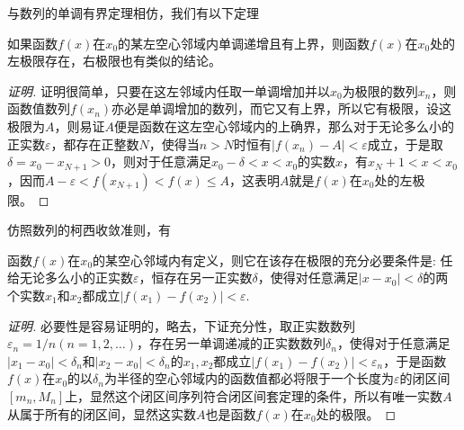 与数列的单调有界定理相仿，我们有以下定理
\begin{theorem}
  如果函数$f(x)$在$x_0$的某左空心邻域内单调递增且有上界，则函数$f(x)$在$x_0$处的左极限存在，右极限也有类似的结论。
\end{theorem}

\begin{proof}[证明]
证明很简单，只要在这左邻域内任取一单调增加并以$x_0$为极限的数列$x_n$，则函数值数列$f(x_n)$亦必是单调增加的数列，而它又有上界，所以它有极限，设这极限为$A$，则易证$A$便是函数在这左空心邻域内的上确界，那么对于无论多么小的正实数$\varepsilon$，都存在正整数$N$，使得当$n>N$时恒有$|f(x_n)-A|<\varepsilon$成立，于是取$\delta = x_0-x_{N+1}>0$，则对于任意满足$x_0-\delta<x<x_0$的实数$x$，有$x_N+1<x<x_0$，因而$A-\varepsilon<f(x_{N+1})<f(x) \leqslant A$，这表明$A$就是$f(x)$在$x_0$处的左极限。
\end{proof}

仿照数列的柯西收敛准则，有
\begin{theorem}
  函数$f(x)$在$x_0$的某空心邻域内有定义，则它在该存在极限的充分必要条件是: 任给无论多么小的正实数$\varepsilon$，恒存在另一正实数$\delta$，使得对任意满足$|x-x_0|<\delta$的两个实数$x_1$和$x_2$都成立$|f(x_1)-f(x_2)|<\varepsilon$.
\end{theorem}

\begin{proof}[证明]
  必要性是容易证明的，略去，下证充分性，取正实数数列$\varepsilon_n=1/n(n=1,2,\ldots)$，存在另一单调递减的正实数数列$\delta_n$，使得对于任意满足$|x_1-x_0|<\delta_n$和$|x_2-x_0|<\delta_n$的$x_1,x_2$都成立$|f(x_1)-f(x_2)|<\varepsilon_n$，于是函数$f(x)$在$x_0$的以$\delta_n$为半径的空心邻域内的函数值都必将限于一个长度为$\varepsilon$的闭区间$[m_n,M_n]$上，显然这个闭区间序列符合闭区间套定理的条件，所以有唯一实数$A$从属于所有的闭区间，显然这实数$A$也是函数$f(x)$在$x_0$处的极限。
\end{proof}

